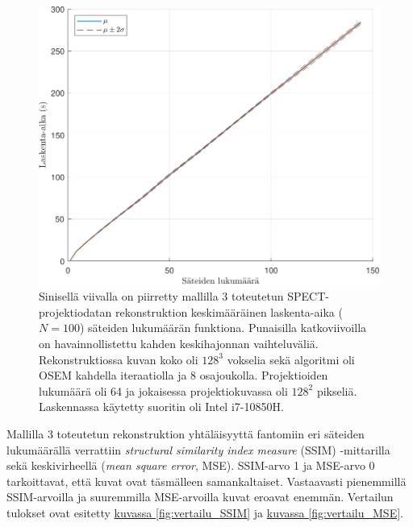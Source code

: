 \begin{figure}[H]
    \centering
    \captionsetup{width=.9\linewidth}
    \includegraphics[width=.9\linewidth]{kuvat/laskenta_aika.pdf}
    \caption{Sinisellä viivalla on piirretty mallilla 3 toteutetun SPECT-projektiodatan rekonstruktion keskimääräinen laskenta-aika ($N=100$) säteiden lukumäärän funktiona. Punaisilla katkoviivoilla on havainnollistettu kahden keskihajonnan vaihteluväliä. Rekonstruktiossa kuvan koko oli $128^3$ vokselia sekä algoritmi oli OSEM kahdella iteraatiolla ja 8 osajoukolla. Projektioiden lukumäärä oli 64 ja jokaisessa projektiokuvassa oli $128^2$ pikseliä. Laskennassa käytetty suoritin oli Intel i7-10850H.}
    \label{fig:laskenta_aika}
\end{figure}

Mallilla 3 toteutetun rekonstruktion yhtäläisyyttä fantomiin eri säteiden lukumäärällä verrattiin \textit{structural similarity index measure} (SSIM) -mittarilla sekä keskivirheellä (\textit{mean square error}, MSE). SSIM-arvo 1 ja MSE-arvo 0 tarkoittavat, että kuvat ovat täsmälleen samankaltaiset. Vastaavasti pienemmillä SSIM-arvoilla ja suuremmilla MSE-arvoilla kuvat eroavat enemmän. Vertailun tulokset ovat esitetty \hyperref[fig:vertailu_SSIM]{kuvassa \ref*{fig:vertailu_SSIM}} ja \hyperref[fig:vertailu_MSE]{kuvassa \ref*{fig:vertailu_MSE}}.

